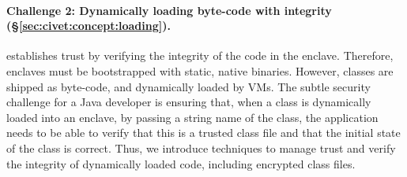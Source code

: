 



\paragraph{\bf Challenge 2: Dynamically loading byte-code with integrity (\S\ref{sec:civet:concept:loading}).}
\sgx{} establishes trust by verifying the integrity of the code in the enclave.
Therefore, enclaves must be bootstrapped with static, native binaries.
However, \java{} classes are shipped as byte-code,
and dynamically loaded by \java{} VMs.
The subtle security challenge for a Java developer 
is ensuring that, when a class is dynamically loaded into an enclave, by passing a string name of the class,
the application needs to be able to verify that this is a trusted class file
and that the initial state of the class is correct.
Thus, we introduce techniques to manage trust and verify the integrity of 
dynamically loaded code, including encrypted class files.

